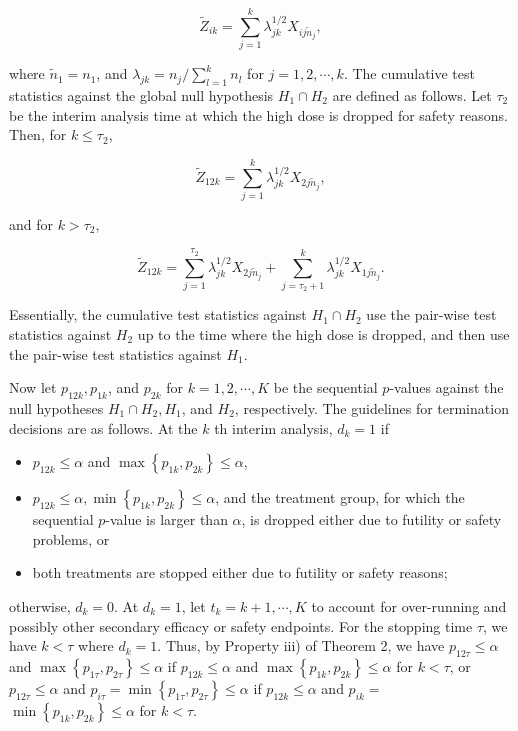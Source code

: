 \documentclass[10pt]{article}
\begin{document}
$$
\tilde{Z}_{i k}=\sum_{j=1}^{k} \lambda_{j k}^{1 / 2} X_{i j \tilde{n}_{j}},
$$

where $\tilde{n}_{1}=n_{1}$, and $\lambda_{j k}=n_{j} / \sum_{l=1}^{k} n_{l}$ for $j=1,2, \cdots, k$. The cumulative test statistics against the global null hypothesis $H_{1} \cap H_{2}$ are defined as follows. Let $\tau_{2}$ be the interim analysis time at which the high dose is dropped for safety reasons. Then, for $k \leq \tau_{2}$,

$$
\tilde{Z}_{12 k}=\sum_{j=1}^{k} \lambda_{j k}^{1 / 2} X_{2 j \tilde{n}_{j}},
$$

and for $k>\tau_{2}$,

$$
\tilde{Z}_{12 k}=\sum_{j=1}^{\tau_{2}} \lambda_{j k}^{1 / 2} X_{2 j \tilde{n}_{j}}+\sum_{j=\tau_{2}+1}^{k} \lambda_{j k}^{1 / 2} X_{1 j \tilde{n}_{j}} .
$$

Essentially, the cumulative test statistics against $H_{1} \cap H_{2}$ use the pair-wise test statistics against $H_{2}$ up to the time where the high dose is dropped, and then use the pair-wise test statistics against $H_{1}$.

Now let $p_{12 k}, p_{1 k}$, and $p_{2 k}$ for $k=1,2, \cdots, K$ be the sequential $p$-values against the null hypotheses $H_{1} \cap H_{2}, H_{1}$, and $H_{2}$, respectively. The guidelines for termination decisions are as follows. At the $k$ th interim analysis, $d_{k}=1$ if

\begin{itemize}
  \item[(a)] $p_{12 k} \leq \alpha$ and $\max \left\{p_{1 k}, p_{2 k}\right\} \leq \alpha$,
  \item[(b)] $p_{12 k} \leq \alpha, \min \left\{p_{1 k}, p_{2 k}\right\} \leq \alpha$, and the treatment group, for which the sequential $p$-value is larger than $\alpha$, is dropped either due to futility or safety problems, or
  \item[(c)] both treatments are stopped either due to futility or safety reasons;
\end{itemize}

otherwise, $d_{k}=0$. At $d_{k}=1$, let $t_{k}=k+1, \cdots, K$ to account for over-running and possibly other secondary efficacy or safety endpoints. For the stopping time $\tau$, we have $k<\tau$ where $d_{k}=1$. Thus, by Property iii) of Theorem 2, we have $p_{12 \tau} \leq \alpha$ and $\max \left\{p_{1 \tau}, p_{2 \tau}\right\} \leq \alpha$ if $p_{12 k} \leq \alpha$ and $\max \left\{p_{1 k}, p_{2 k}\right\} \leq \alpha$ for $k<\tau$, or $p_{12 \tau} \leq \alpha$ and $p_{i \tau}=\min \left\{p_{1 \tau}, p_{2 \tau}\right\} \leq \alpha$ if $p_{12 k} \leq \alpha$ and $p_{i k}=$ $\min \left\{p_{1 k}, p_{2 k}\right\} \leq \alpha$ for $k<\tau$.
\end{document}
